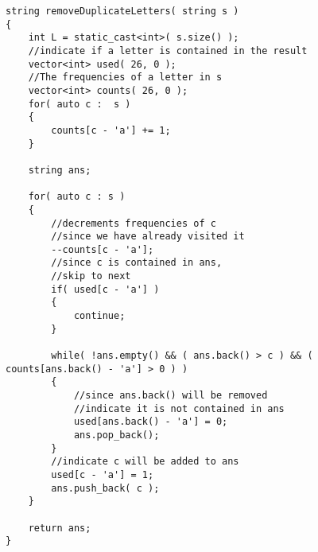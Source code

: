 \setcounter{lstlisting}{0}
\begin{lstlisting}[style=customc, caption={Hash Map}]
string removeDuplicateLetters( string s )
{
    int L = static_cast<int>( s.size() );
    //indicate if a letter is contained in the result
    vector<int> used( 26, 0 );
    //The frequencies of a letter in s
    vector<int> counts( 26, 0 );
    for( auto c :  s )
    {
        counts[c - 'a'] += 1;
    }
    
    string ans;
    
    for( auto c : s )
    {
        //decrements frequencies of c
        //since we have already visited it
        --counts[c - 'a'];
        //since c is contained in ans,
        //skip to next
        if( used[c - 'a'] )
        {
            continue;
        }

        while( !ans.empty() && ( ans.back() > c ) && ( counts[ans.back() - 'a'] > 0 ) )
        {
            //since ans.back() will be removed
            //indicate it is not contained in ans
            used[ans.back() - 'a'] = 0;
            ans.pop_back();
        }
        //indicate c will be added to ans
        used[c - 'a'] = 1;
        ans.push_back( c );
    }

    return ans;
}
\end{lstlisting}